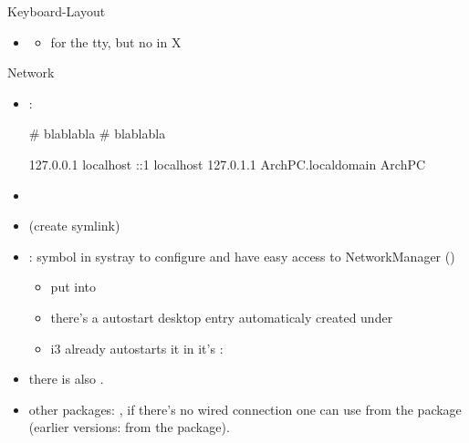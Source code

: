 \begin{frame}{Keyboard-Layout}
  \begin{itemize}
    \item {}
      \begin{itemize}
        \item for the tty, but no in X
      \end{itemize}
  \end{itemize}
\end{frame}

\begin{frame}{Network}
  \begin{itemize}
     \item {}:
       \begin{terminal}[]
        # blablabla
        # blablabla

        127.0.0.1 localhost
        ::1 localhost
        127.0.1.1 ArchPC.localdomain ArchPC
     \end{terminal}
    \item {}
    \item {} (create symlink)
    \item {}: symbol in systray to configure and have easy access to NetworkManager ()
      \begin{itemize}
      \item put  into 
      \item there's a autostart desktop entry automaticaly created under 
      \item i3 already autostarts it in it's : 
      \end{itemize}
  \end{itemize}
  \begin{Sidenote}
    \begin{itemize}
      \item there is also .
    \end{itemize}
  \end{Sidenote}
  \begin{Sidenote}
    \begin{itemize}
      \item \alert{other packages:} , if there's no wired connection one can use  from the  package (earlier versions:  from the  package).
    \end{itemize}
  \end{Sidenote}
\end{frame}

